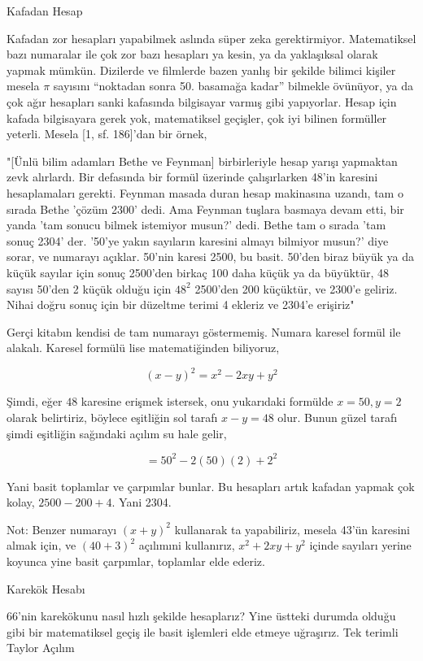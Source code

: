 \documentclass[12pt,fleqn]{article}\usepackage{../../common}
\begin{document}
Kafadan Hesap

Kafadan zor hesapları yapabilmek aslında süper zeka gerektirmiyor. Matematiksel
bazı numaralar ile çok zor bazı hesapları ya kesin, ya da yaklaşıksal olarak
yapmak mümkün. Dizilerde ve filmlerde bazen yanlış bir şekilde bilimci kişiler
mesela $\pi$ sayısını ``noktadan sonra 50. basamağa kadar'' bilmekle övünüyor,
ya da çok ağır hesapları sanki kafasında bilgisayar varmış gibi
yapıyorlar. Hesap için kafada bilgisayara gerek yok, matematiksel geçişler, çok
iyi bilinen formüller yeterli. Mesela [1, sf. 186]'dan bir örnek,

"[Ünlü bilim adamları Bethe ve Feynman] birbirleriyle hesap yarışı yapmaktan
zevk alırlardı. Bir defasında bir formül üzerinde çalışırlarken 48'in karesini
hesaplamaları gerekti. Feynman masada duran hesap makinasına uzandı, tam o
sırada Bethe 'çözüm 2300' dedi. Ama Feynman tuşlara basmaya devam etti, bir
yanda 'tam sonucu bilmek istemiyor musun?' dedi. Bethe tam o sırada 'tam sonuç
2304' der. '50'ye yakın sayıların karesini almayı bilmiyor musun?' diye sorar,
ve numarayı açıklar. 50'nin karesi 2500, bu basit. 50'den biraz büyük ya da
küçük sayılar için sonuç 2500'den birkaç 100 daha küçük ya da büyüktür, 48
sayısı 50'den 2 küçük olduğu için $48^2$ 2500'den 200 küçüktür, ve 2300'e
geliriz. Nihai doğru sonuç için bir düzeltme terimi 4 ekleriz ve 2304'e
erişiriz"

Gerçi kitabın kendisi de tam numarayı göstermemiş. Numara karesel formül ile
alakalı. Karesel formülü lise matematiğinden biliyoruz,

$$ (x-y)^2 = x^2 - 2xy + y^2 $$

Şimdi, eğer $48$ karesine erişmek istersek, onu yukarıdaki formülde $x=50,y=2$
olarak belirtiriz, böylece eşitliğin sol tarafı $x-y = 48$ olur. Bunun güzel
tarafı şimdi eşitliğin sağındaki açılım su hale gelir,

$$ = 50^2 - 2(50)(2) + 2^2 $$

Yani basit toplamlar ve çarpımlar bunlar. Bu hesapları artık kafadan yapmak çok
kolay, $2500 - 200 + 4$. Yani 2304.

Not: Benzer numarayı $(x+y)^2$ kullanarak ta yapabiliriz, mesela 43'ün karesini
almak için, ve $(40+3)^2$ açılımıni kullanırız, $x^2+2xy+y^2$ içinde sayıları
yerine koyunca yine basit çarpımlar, toplamlar elde ederiz. 

Karekök Hesabı

66'nin karekökunu nasıl hızlı şekilde hesaplarız? Yine üstteki durumda olduğu
gibi bir matematiksel geçiş ile basit işlemleri elde etmeye uğraşırız. Tek
terimli Taylor Açılım 
\end{document}
